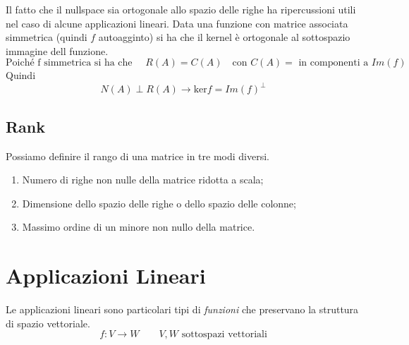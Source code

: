 \documentclass[x11names]{article}
\begin{document}
\noindent
Il fatto che il nullspace sia ortogonale allo spazio delle righe ha ripercussioni utili nel caso di alcune applicazioni lineari. Data una funzione con matrice associata simmetrica (quindi $f$ autoagginto) si ha che il kernel è ortogonale al sottospazio immagine dell funzione.
\[
\text{Poiché f simmetrica si ha che } \quad R(A) = C(A) \quad \text{con } C(A) = \text{ in componenti a } Im(f) 
\]
Quindi
\[
N(A) \perp R(A) \to \text{ker}f = Im(f)^\perp
\]

\subsection{Rank}
Possiamo definire il rango di una matrice in tre modi diversi.
\begin{enumerate}
	\item Numero di righe non nulle della matrice ridotta a scala;
	\item Dimensione dello spazio delle righe o dello spazio delle colonne;
	\item Massimo ordine di un minore non nullo della matrice.
\end{enumerate}






\newpage
\section{Applicazioni Lineari}
Le applicazioni lineari sono particolari tipi di \textit{funzioni} che preservano la struttura di spazio vettoriale.
\[
f: V \longrightarrow W \qquad V,W \text{ sottospazi vettoriali}
\] 
\end{document}
